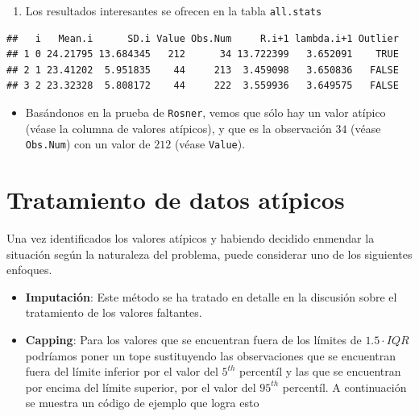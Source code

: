 \documentclass[
]{book}
\newenvironment{Shaded}{\begin{snugshade}}{\end{snugshade}}
\newcommand{\NormalTok}[1]{#1}
\newcommand{\SpecialCharTok}[1]{\textcolor[rgb]{0.81,0.36,0.00}{\textbf{#1}}}
\providecommand{\tightlist}{%
  \setlength{\itemsep}{0pt}\setlength{\parskip}{0pt}}
\begin{document}
\begin{enumerate}
\def\labelenumi{\arabic{enumi}.}
\setcounter{enumi}{1}
\tightlist
\item
  Los resultados interesantes se ofrecen en la tabla \texttt{all.stats}
\end{enumerate}

\begin{Shaded}
\end{Shaded}

\begin{verbatim}
##   i   Mean.i      SD.i Value Obs.Num     R.i+1 lambda.i+1 Outlier
## 1 0 24.21795 13.684345   212      34 13.722399   3.652091    TRUE
## 2 1 23.41202  5.951835    44     213  3.459098   3.650836   FALSE
## 3 2 23.32328  5.808172    44     222  3.559936   3.649575   FALSE
\end{verbatim}

\begin{itemize}
\tightlist
\item
  Basándonos en la prueba de \texttt{Rosner}, vemos que sólo hay un valor atípico (véase la columna de valores atípicos), y que es la observación \(34\) (véase \texttt{Obs.Num}) con un valor de \(212\) (véase \texttt{Value}).
\end{itemize}

\section{Tratamiento de datos atípicos}\label{tratamiento-de-datos-atuxedpicos}

Una vez identificados los valores atípicos y habiendo decidido enmendar la situación según la naturaleza del problema, puede considerar uno de los siguientes enfoques.

\begin{itemize}
\item
  \textbf{Imputación}: Este método se ha tratado en detalle en la discusión sobre el tratamiento de los valores faltantes.
\item
  \textbf{Capping}: Para los valores que se encuentran fuera de los límites de \(1.5 \cdot IQR\) podríamos poner un tope sustituyendo las observaciones que se encuentran fuera del límite inferior por el valor del \(5^{th}\) percentíl y las que se encuentran por encima del límite superior, por el valor del \(95^{th}\) percentíl. A continuación se muestra un código de ejemplo que logra esto
\end{itemize}
\end{document}
